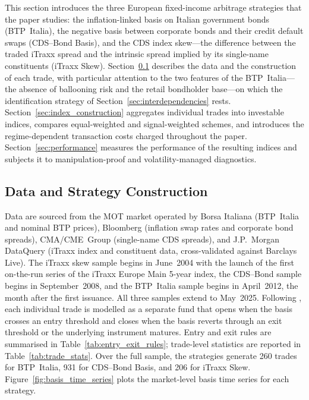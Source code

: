 


This section introduces the three European fixed-income arbitrage
strategies that the paper studies: the inflation-linked basis on
Italian government bonds (BTP~Italia), the negative basis between
corporate bonds and their credit default swaps (CDS--Bond Basis), and
the CDS index skew---the difference between the traded iTraxx spread
and the intrinsic spread implied by its single-name constituents
(iTraxx Skew). Section~\ref{sec:strategy_construction} describes
the data and the construction of each trade, with particular attention
to the two features of the BTP~Italia---the absence of ballooning risk
and the retail bondholder base---on which the identification strategy
of Section~\ref{sec:interdependencies} rests.
Section~\ref{sec:index_construction} aggregates individual trades into
investable indices, compares equal-weighted and signal-weighted
schemes, and introduces the regime-dependent transaction costs charged
throughout the paper. Section~\ref{sec:performance} measures the
performance of the resulting indices and subjects it to
manipulation-proof and volatility-managed diagnostics.


\subsection{Data and Strategy Construction}
\label{sec:strategy_construction}

Data are sourced from the MOT market operated by Borsa Italiana
(BTP~Italia and nominal BTP prices), Bloomberg (inflation swap rates
and corporate bond spreads), CMA/CME~Group (single-name CDS spreads),
and J.P.~Morgan DataQuery (iTraxx index and constituent data,
cross-validated against Barclays Live). The iTraxx skew sample begins
in June~2004 with the launch of the first on-the-run series of the
iTraxx Europe Main 5-year index, the CDS--Bond sample begins in
September~2008, and the BTP~Italia sample begins in April~2012, the
month after the first issuance. All three samples extend to May~2025.
Following \citet{duarte2007risk}, each individual trade is modelled as
a separate fund that opens when the basis crosses an entry threshold
and closes when the basis reverts through an exit threshold or the
underlying instrument matures. Entry and exit rules are summarised in
Table~\ref{tab:entry_exit_rules}; trade-level statistics are reported
in Table~\ref{tab:trade_stats}. Over the full sample, the strategies
generate 260 trades for BTP~Italia, 931 for CDS--Bond Basis, and 206
for iTraxx Skew. Figure~\ref{fig:basis_time_series} plots the
market-level basis time series for each strategy.


